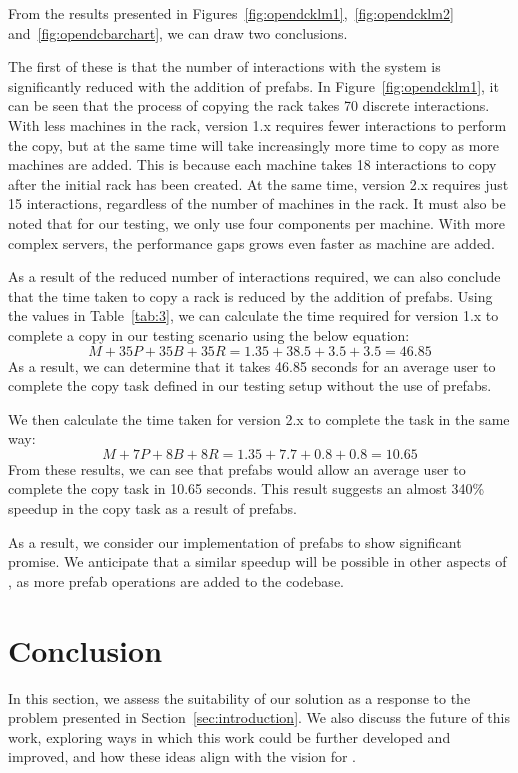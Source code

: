 \documentclass[11pt]{article}
\begin{document}
			From the results presented in Figures~\ref{fig:opendcklm1},~\ref{fig:opendcklm2} and~\ref{fig:opendcbarchart}, we can draw two conclusions.

			The first of these is that the number of interactions with the system is significantly reduced with the addition of prefabs.
			In Figure~\ref{fig:opendcklm1}, it can be seen that the process of copying the rack takes 70 discrete interactions.
			With less machines in the rack, version 1.x requires fewer interactions to perform the copy, but at the same time will take increasingly more time to copy as more machines are added.
			This is because each machine takes 18 interactions to copy after the initial rack has been created.
			At the same time, version 2.x requires just 15 interactions, regardless of the number of machines in the rack.
			It must also be noted that for our testing, we only use four components per machine.
			With more complex servers, the performance gaps grows even faster as machine are added.

			As a result of the reduced number of interactions required, we can also conclude that the time taken to copy a rack is reduced by the addition of prefabs.
			Using the values in Table~\ref{tab:3}, we can calculate the time required for version 1.x to complete a copy in our testing scenario using the below equation:
			$$M + 35P + 35B + 35R= 1.35 + 38.5 + 3.5 + 3.5= 46.85$$
			As a result, we can determine that it takes 46.85 seconds for an average user to complete the copy task defined in our testing setup without the use of prefabs.

			We then calculate the time taken for version 2.x to complete the task in the same way:
			$$M + 7P + 8B + 8R= 1.35 + 7.7 + 0.8 + 0.8= 10.65$$
			From these results, we can see that prefabs would allow an average user to complete the copy task in 10.65 seconds.
			This result suggests an almost 340\% speedup in the copy task as a result of prefabs.

			As a result, we consider our implementation of prefabs to show significant promise. We anticipate that a similar speedup will be possible in other aspects of \opendc{}, as more prefab operations are added to the \opendc{} codebase.

\newpage

\section{Conclusion} \label{sec:conclusion}
	In this section, we assess the suitability of our solution as a response to the problem presented in Section~\ref{sec:introduction}.
	We also discuss the future of this work, exploring ways in which this work could be further developed and improved, and how these ideas align with the vision for \opendc{} \cite{Iosup2017}.
\end{document}
